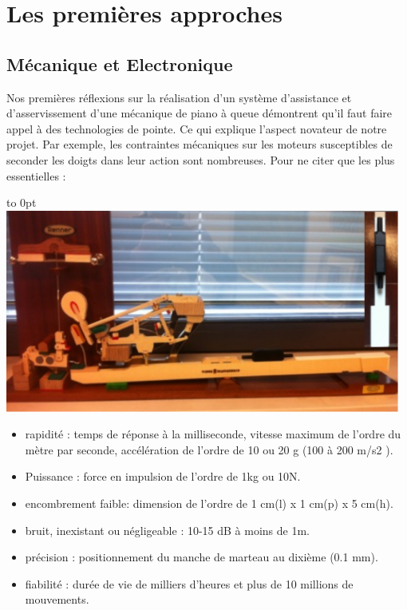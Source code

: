 \documentclass[french,a4paper,12pt]{report}
\begin{document}
\chapter{Les premières approches}

  \section{Mécanique et Electronique}
Nos premières réflexions sur la réalisation d’un système d’assistance et d’asservissement d’une mécanique de piano à queue démontrent qu’il faut faire appel à des technologies de pointe. Ce qui explique l’aspect novateur de notre projet. Par exemple, les contraintes mécaniques sur les moteurs susceptibles de seconder les doigts dans leur action sont nombreuses. Pour ne citer que les plus essentielles :\newline

\hfill\hbox to 0pt{\hss\includegraphics[width=13cm]{MECA_PIANO2.png}\hss}\hfill\null\newline

\begin{itemize}
\item  rapidité : temps de réponse à la milliseconde, vitesse maximum de l’ordre du mètre par
seconde, accélération de l’ordre de 10 ou 20 g (100 à 200 m/s2 ).

\item Puissance : force en impulsion de l'ordre de 1kg ou 10N.

\item encombrement faible: dimension de l'ordre de 1 cm(l) x 1 cm(p) x 5 cm(h).

\item bruit, inexistant ou négligeable : 10-15 dB à moins de 1m.

\item précision : positionnement du manche de marteau au dixième (0.1 mm).

\item fiabilité : durée de vie de milliers d'heures et plus de 10 millions de mouvements.
\end{itemize}
\end{document}
